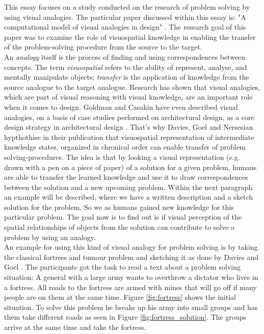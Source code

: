 \documentclass[12pt]{article}
\begin{document}
\noindent This essay focuses on a study conducted on the research of problem solving by using visual analogies. The particular paper discussed within this essay is: "A computational model of visual analogies in design" \cite{davies2009computational}. The research goal of this paper was to examine the role of visuospatial knowledge in enabling
the transfer of the problem-solving procedure from the source to the target. \\
\indent An \textit{analogy} itself is the process of finding and using correspondences between concepts. The term \textit{visuospatial} refers to the ability of represent, analyse, and mentally manipulate objects; \textit{transfer} is the application of knowledge from the source analogue to the target analogue. Research has shown that visual analogies, which are part of visual reasoning with visual knowledge, are an important role when it comes to design. Goldman and Casakin have even described visual analogies, on a basis of case studies performed on architectural design, as a core design strategy in architectural design \cite{casakin1999expertise}. That's why Davies, Goel and Nersesian hypthothise in their publication that visuospatial representation of intermediate knowledge states, organized in chronical order can enable transfer of problem solving-procedures. The idea is that by looking a visual representation (e.g. drawn with a pen on a piece of paper) of a solution for a given problem, humans are able to transfer the learned knowledge and use it to draw correspondences between the solution and a new upcoming problem. Within the next paragraph an example will be described, where we have a written description and a sketch solution for the problem. So we as humans gained new knowledge for this particular problem. The goal now is to find out is if visual perception of the spatial relationships of objects from the solution can contribute to solve a 
problem by using an analogy. \\
\indent An example for using this kind of visual analogy for problem solving is by taking the classical fortress and tumour problem \cite{duncker1926qualitative} and sketching it as done by Davies and Goel \cite{davies2001visual}. The participants got the task to read a text about a problem solving situation: A general with a large army wants to overthrow a dictator who lives in a fortress. All roads to the fortress are armed with mines that will go off if many people are on them at the same time. Figure \ref{fig:fortress} shows the initial situation. To solve this problem he breaks up his army into small groups and has them take different roads as seen in Figure \ref{fig:fortress_solution}. The groups arrive at the same time and take the fortress.  
\end{document}
